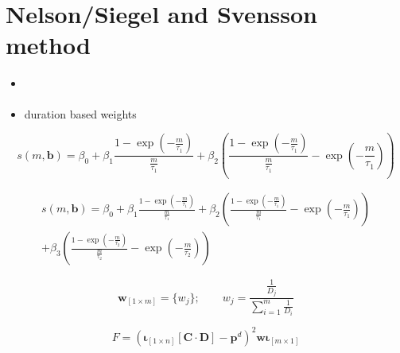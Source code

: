 
\section{Nelson/Siegel and Svensson method}
\label{sec:nels-svenss-meth}


\begin{itemize}
\item \cite{Geyer1999}
\item duration based weights \cite{Bliss1997}
\end{itemize}

\begin{equation}
  \label{eq:nelson-spot}
   s(m,\bm{b}) = \beta_0 + \beta_1\frac{1-\exp(-\frac{m}{\tau_1})}{\frac{m}{\tau_1}} + \beta_2\left(\frac{1-\exp(-\frac{m}{\tau_1})}{\frac{m}{\tau_1}} - \exp(-\frac{m}{\tau_1})\right)
\end{equation}

 



\begin{multline}\label{eq:svensson-spot}
    s(m,\bm{b}) = \beta_0 + \beta_1\frac{1-\exp(-\frac{m}{\tau_1})}{\frac{m}{\tau_1}} + \beta_2\left(\frac{1-\exp(-\frac{m}{\tau_1})}{\frac{m}{\tau_1}} - \exp(-\frac{m}{\tau_1})\right) \\+ \beta_3\left(\frac{1-\exp(-\frac{m}{\tau_2})}{\frac{m}{\tau_2}} - \exp(-\frac{m}{\tau_2})\right)
\end{multline}


\begin{equation}\label{eq:weights}
  \bm{w}_{\left[1\times m\right]}= \{w_j\}; \qquad   w_j=\frac{\frac{1}{D_j}}{\sum_{i=1}^m\frac{1}{D_i}}
\end{equation}


\begin{equation}\label{eq:objfct-nelson}
	F=\left( \bm{\iota}_{\left[1 \times n\right]}\left[\bm{C}\cdot\bm{D}\right] - 		\bm{p}^d\right)^2 \bm{w}\bm{\iota}_{\left[m \times 1\right]}
\end{equation}





